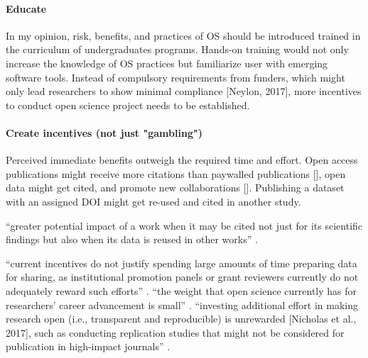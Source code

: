 \paragraph{Educate}


In my opinion, risk, benefits, and practices of OS should be introduced trained
in the curriculum of undergraduates programs.
%
Hands-on training would not only increase the knowledge of OS practices but
familiarize user with emerging software tools.
%
Instead of compulsory requirements from funders, which might only lead
researchers to show minimal compliance [Neylon, 2017], more incentives to
conduct open science project needs to be established.





\paragraph{Create incentives (not just "gambling")}


%
Perceived immediate benefits outweigh the required time and effort.
%
Open access publications might receive more citations than paywalled
publications [\citep{piwowar2018state}], open data might get cited, and promote
new collaborations [\citep{popkin2019data}].
%
Publishing a dataset with an assigned DOI might get re-used and cited in another
study.

``greater potential impact of a work when it may be cited not just for its
scientific findings but also when its data is reused in other works''
\citep{nichols2017best}.

``current incentives do not justify spending large amounts of time preparing
data for sharing, as institutional promotion panels or grant reviewers currently
do not adequately reward such efforts'' \citep{nichols2017best}.
%
``the weight that open science currently has for researchers' career advancement
is small'' \citep{toribio2021early}.
%
``investing additional effort in making research open (i.e., transparent and
reproducible) is unrewarded [Nicholas et al., 2017], such as conducting
replication studies that might not be considered for publication in high-impact
journals'' \citep{toribio2021early}.

